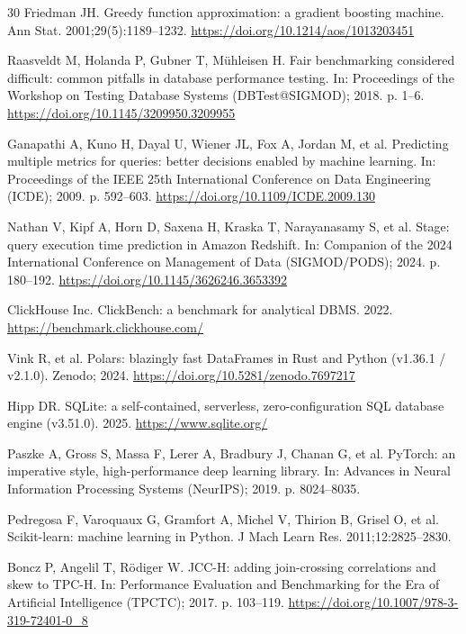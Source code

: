 \documentclass[10pt,a4paper]{article}
\begin{document}
{\begin{thebibliography}{30}
Friedman JH. Greedy function approximation: a gradient boosting machine. Ann Stat. 2001;29(5):1189--1232. \url{https://doi.org/10.1214/aos/1013203451}

Raasveldt M, Holanda P, Gubner T, M{\"u}hleisen H. Fair benchmarking considered difficult: common pitfalls in database performance testing. In: Proceedings of the Workshop on Testing Database Systems (DBTest@SIGMOD); 2018. p. 1--6. \url{https://doi.org/10.1145/3209950.3209955}

Ganapathi A, Kuno H, Dayal U, Wiener JL, Fox A, Jordan M, et al. Predicting multiple metrics for queries: better decisions enabled by machine learning. In: Proceedings of the IEEE 25th International Conference on Data Engineering (ICDE); 2009. p. 592--603. \url{https://doi.org/10.1109/ICDE.2009.130}

Nathan V, Kipf A, Horn D, Saxena H, Kraska T, Narayanasamy S, et al. Stage: query execution time prediction in Amazon Redshift. In: Companion of the 2024 International Conference on Management of Data (SIGMOD/PODS); 2024. p. 180--192. \url{https://doi.org/10.1145/3626246.3653392}

ClickHouse Inc. ClickBench: a benchmark for analytical DBMS. 2022. \url{https://benchmark.clickhouse.com/}

Vink R, et al. Polars: blazingly fast DataFrames in Rust and Python (v1.36.1 / v2.1.0). Zenodo; 2024. \url{https://doi.org/10.5281/zenodo.7697217}

Hipp DR. SQLite: a self-contained, serverless, zero-configuration SQL database engine (v3.51.0). 2025. \url{https://www.sqlite.org/}

Paszke A, Gross S, Massa F, Lerer A, Bradbury J, Chanan G, et al. PyTorch: an imperative style, high-performance deep learning library. In: Advances in Neural Information Processing Systems (NeurIPS); 2019. p. 8024--8035.

Pedregosa F, Varoquaux G, Gramfort A, Michel V, Thirion B, Grisel O, et al. Scikit-learn: machine learning in Python. J Mach Learn Res. 2011;12:2825--2830.

Boncz P, Angelil T, R{\"o}diger W. JCC-H: adding join-crossing correlations and skew to TPC-H. In: Performance Evaluation and Benchmarking for the Era of Artificial Intelligence (TPCTC); 2017. p. 103--119. \url{https://doi.org/10.1007/978-3-319-72401-0_8}


\end{thebibliography}}
\end{document}
